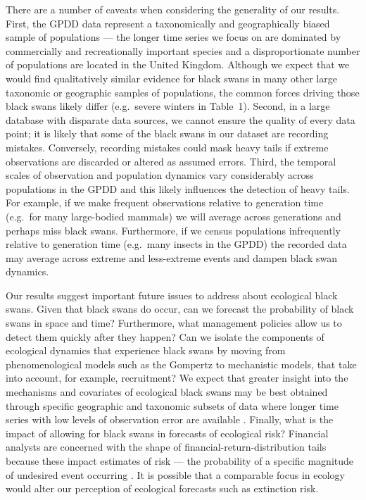 There are a number of caveats when considering the generality of our results.
First, the GPDD data represent a taxonomically and geographically biased sample
of populations --- the longer time series we focus on are dominated by
commercially and recreationally important species and a disproportionate number
of populations are located in the United Kingdom. Although we expect that we
would find qualitatively similar evidence for black swans in many other large
taxonomic or
geographic samples of populations, the common forces driving
those black swans likely differ (e.g.~severe
winters in Table~1). Second, in a large database with disparate
data sources, we cannot ensure the quality of every data point; it is likely
that some of the black swans in our dataset are recording mistakes.
Conversely, recording mistakes could mask heavy tails if extreme observations
are discarded or altered as assumed errors. Third, the temporal scales of
observation and population dynamics vary considerably across populations in the
GPDD and this likely influences the detection of heavy tails. For example, if
we make frequent observations relative to generation time (e.g.~for many
large-bodied mammals) we will average across generations and perhaps miss black
swans. Furthermore, if we census populations infrequently relative to
generation time (e.g.~many insects in the GPDD) the recorded data may average
across extreme and less-extreme events and dampen black swan dynamics.

Our results suggest important future issues to address about ecological black
swans. Given that black swans do occur, can we forecast the probability of
black swans in space and time? Furthermore, what management policies allow us
to detect them quickly after they happen? Can we isolate the components of
ecological dynamics that experience black swans by moving from
phenomenological models such as the Gompertz to mechanistic models, that take
into account, for example, recruitment? We expect that greater insight into the
mechanisms and covariates of ecological black swans may be best obtained
through specific geographic and taxonomic subsets of data where longer time
series with low levels of observation error are available
\citep[e.g.][]{segura2013}. Finally, what is the impact of
allowing for black swans in forecasts of ecological risk? Financial analysts
are concerned with the shape of financial-return-distribution tails because
these impact estimates of risk --- the probability of a specific magnitude of
undesired event occurring \citep{rachev2008}. It is possible that a comparable
focus in ecology would alter our perception of ecological forecasts such as
extinction risk.


